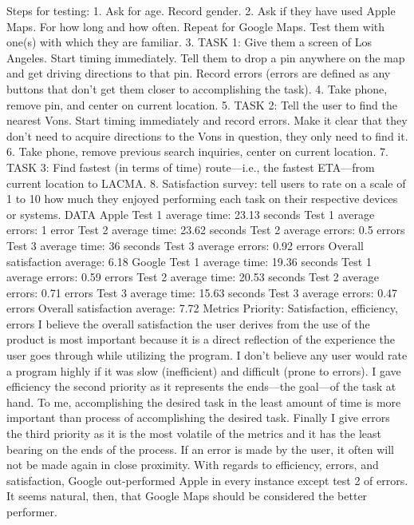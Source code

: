 Steps for testing:
1. Ask for age. Record gender.
2. Ask if they have used Apple Maps. For how long and how often. Repeat for Google Maps. Test them with one(s) with which they are familiar.
3. TASK 1: Give them a screen of Los Angeles. Start timing immediately. Tell them to drop a pin anywhere on the map and get driving directions to that pin. Record errors (errors are defined as any buttons that don't get them closer to accomplishing the task).
4. Take phone, remove pin, and center on current location.
5. TASK 2: Tell the user to find the nearest Vons. Start timing immediately and record errors. Make it clear that they don't need to acquire directions to the Vons in question, they only need to find it.
6. Take phone, remove previous search inquiries, center on current location.
7. TASK 3: Find fastest (in terms of time) route—i.e., the fastest ETA—from current location to LACMA.
8. Satisfaction survey: tell users to rate on a scale of 1 to 10 how much they enjoyed performing each task on their respective devices or systems.
DATA
Apple
Test 1 average time: 23.13 seconds
Test 1 average errors: 1 error
Test 2 average time: 23.62 seconds
Test 2 average errors: 0.5 errors 
Test 3 average time: 36 seconds
Test 3 average errors: 0.92 errors
Overall satisfaction average: 6.18
Google
Test 1 average time: 19.36 seconds
Test 1 average errors: 0.59 errors
Test 2 average time: 20.53 seconds
Test 2 average errors: 0.71 errors 
Test 3 average time: 15.63 seconds
Test 3 average errors: 0.47 errors
Overall satisfaction average: 7.72
Metrics
Priority: Satisfaction, efficiency, errors
I believe the overall satisfaction the user derives from the use of the product is most important because it is a direct reflection of the experience the user goes through while utilizing the program. I don’t believe any user would rate a program highly if it was slow (inefficient) and difficult (prone to errors). I gave efficiency the second priority as it represents the ends—the goal—of the task at hand. To me, accomplishing the desired task in the least amount of time is more important than process of accomplishing the desired task. Finally I give errors the third priority as it is the most volatile of the metrics and it has the least bearing on the ends of the process. If an error is made by the user, it often will not be made again in close proximity.
With regards to efficiency, errors, and satisfaction, Google out-performed Apple in every instance except test 2 of errors. It seems natural, then, that Google Maps should be considered the better performer.

